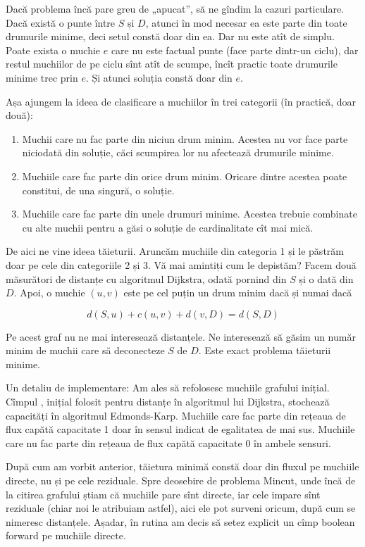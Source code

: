 \documentclass[../main.tex]{subfiles}
\begin{document}
Dacă problema încă pare greu de „apucat”, să ne gîndim la cazuri particulare. Dacă există o punte între $S$ și $D$, atunci în mod necesar ea este parte din toate drumurile minime, deci setul constă doar din ea. Dar nu este atît de simplu. Poate exista o muchie $e$ care nu este factual punte (face parte dintr-un ciclu), dar restul muchiilor de pe ciclu sînt atît de scumpe, încît practic toate drumurile minime trec prin $e$. Și atunci soluția constă doar din $e$.

Așa ajungem la ideea de clasificare a muchiilor în trei categorii (în practică, doar două):

\begin{enumerate}
  \item Muchii care nu fac parte din niciun drum minim. Acestea nu vor face parte niciodată din soluție, căci scumpirea lor nu afectează drumurile minime.

  \item Muchiile care fac parte din orice drum minim. Oricare dintre acestea poate constitui, de una singură, o soluție.

  \item Muchiile care fac parte din unele drumuri minime. Acestea trebuie combinate cu alte muchii pentru a găsi o soluție de cardinalitate cît mai mică.
\end{enumerate}

De aici ne vine ideea tăieturii. Aruncăm muchiile din categoria 1 și le păstrăm doar pe cele din categoriile 2 și 3. Vă mai amintiți cum le depistăm? Facem două măsurători de distanțe cu algoritmul Dijkstra, odată pornind din $S$ și o dată din $D$. Apoi, o muchie $(u, v)$ este pe cel puțin un drum minim dacă și numai dacă

$$d(S, u) + c(u, v) + d(v, D) = d(S, D)$$

Pe acest graf nu ne mai interesează distanțele. Ne interesează să găsim un număr minim de muchii care să deconecteze $S$ de $D$. Este exact problema tăieturii minime.

Un detaliu de implementare: Am ales să refolosesc muchiile grafului inițial. Cîmpul , inițial folosit pentru distanțe în algoritmul lui Dijkstra, stochează capacități în algoritmul Edmonds-Karp. Muchiile care fac parte din rețeaua de flux capătă capacitate 1 doar în sensul indicat de egalitatea de mai sus. Muchiile care nu fac parte din rețeaua de flux capătă capacitate 0 în ambele sensuri.

După cum am vorbit anterior, tăietura minimă constă doar din fluxul pe muchiile directe, nu și pe cele reziduale. Spre deosebire de problema Mincut, unde încă de la citirea grafului știam că muchiile pare sînt directe, iar cele impare sînt reziduale (chiar noi le atribuiam astfel), aici ele pot surveni oricum, după cum se nimeresc distanțele. Așadar, în rutina  am decis să setez explicit un cîmp boolean forward pe muchiile directe.
\end{document}
